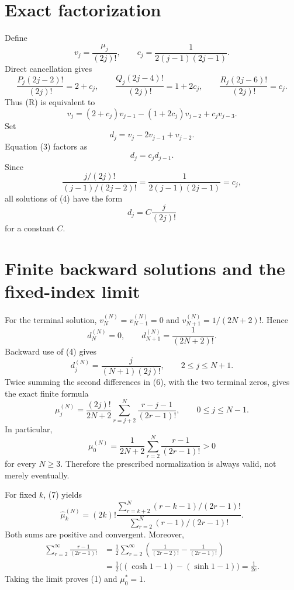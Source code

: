 \documentclass[11pt]{article}
\begin{document}
\section{Exact factorization}

Define
\[
v_j=\frac{\mu_j}{(2j)!},
\qquad
c_j=\frac{1}{2(j-1)(2j-1)}.
\]
Direct cancellation gives
\[
\frac{P_j(2j-2)!}{(2j)!}=2+c_j,\qquad
\frac{Q_j(2j-4)!}{(2j)!}=1+2c_j,\qquad
\frac{R_j(2j-6)!}{(2j)!}=c_j.
\]
Thus (R) is equivalent to
\begin{equation}
v_j=(2+c_j)v_{j-1}-(1+2c_j)v_{j-2}+c_jv_{j-3}.
\tag{3}
\end{equation}
Set
\[
d_j=v_j-2v_{j-1}+v_{j-2}.
\]
Equation (3) factors as
\begin{equation}
d_j=c_jd_{j-1}.
\tag{4}
\end{equation}
Since
\[
\frac{j/(2j)!}{(j-1)/(2j-2)!}
=\frac{1}{2(j-1)(2j-1)}=c_j,
\]
all solutions of (4) have the form
\begin{equation}
d_j=C\frac{j}{(2j)!}
\tag{5}
\end{equation}
for a constant \(C\).

\section{Finite backward solutions and the fixed-index limit}

For the terminal solution, \(v_N^{(N)}=v_{N-1}^{(N)}=0\) and
\(v_{N+1}^{(N)}=1/(2N+2)!\).  Hence
\[
d_N^{(N)}=0,\qquad d_{N+1}^{(N)}=\frac{1}{(2N+2)!}.
\]
Backward use of (4) gives
\begin{equation}
d_j^{(N)}=\frac{j}{(N+1)(2j)!},
\qquad 2\leq j\leq N+1.
\tag{6}
\end{equation}
Twice summing the second differences in (6), with the two terminal zeros,
gives the exact finite formula
\begin{equation}
\mu_j^{(N)}
=\frac{(2j)!}{2N+2}\sum_{r=j+2}^{N}
\frac{r-j-1}{(2r-1)!},
\qquad 0\leq j\leq N-1.
\tag{7}
\end{equation}
In particular,
\[
\mu_0^{(N)}=\frac{1}{2N+2}
\sum_{r=2}^{N}\frac{r-1}{(2r-1)!}>0
\]
for every \(N\geq 3\).  Therefore the prescribed normalization is always
valid, not merely eventually.

For fixed \(k\), (7) yields
\[
\widehat\mu_k^{(N)}=(2k)!
\frac{\displaystyle\sum_{r=k+2}^{N}(r-k-1)/(2r-1)!}
{\displaystyle\sum_{r=2}^{N}(r-1)/(2r-1)!}.
\]
Both sums are positive and convergent.  Moreover,
\begin{align*}
\sum_{r=2}^{\infty}\frac{r-1}{(2r-1)!}
&=\frac12\sum_{r=2}^{\infty}
\left(\frac{1}{(2r-2)!}-\frac{1}{(2r-1)!}\right)\\
&=\frac12\bigl((\cosh 1-1)-(\sinh 1-1)\bigr)
=\frac{1}{2e}.
\end{align*}
Taking the limit proves (1) and \(\mu_0^*=1\).
\end{document}
